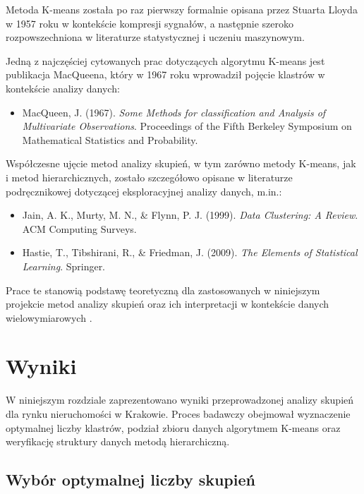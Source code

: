 \documentclass{report}
\begin{document}
Metoda K-means została po raz pierwszy formalnie opisana przez Stuarta Lloyda w 1957 roku w kontekście kompresji sygnałów, a następnie szeroko rozpowszechniona w literaturze statystycznej i uczeniu maszynowym.

Jedną z najczęściej cytowanych prac dotyczących algorytmu K-means jest publikacja MacQueena, który w 1967 roku wprowadził pojęcie klastrów w kontekście analizy danych:

\begin{itemize}
    \item MacQueen, J. (1967). \textit{Some Methods for classification and Analysis of Multivariate Observations}. Proceedings of the Fifth Berkeley Symposium on Mathematical Statistics and Probability.
\end{itemize}

Współczesne ujęcie metod analizy skupień, w tym zarówno metody K-means, jak i metod hierarchicznych, zostało szczegółowo opisane w literaturze podręcznikowej dotyczącej eksploracyjnej analizy danych, m.in.:

\begin{itemize}
    \item Jain, A. K., Murty, M. N., \& Flynn, P. J. (1999). \textit{Data Clustering: A Review}. ACM Computing Surveys.
    \item Hastie, T., Tibshirani, R., \& Friedman, J. (2009). \textit{The Elements of Statistical Learning}. Springer.
\end{itemize}

Prace te stanowią podstawę teoretyczną dla zastosowanych w niniejszym projekcie metod analizy skupień oraz ich interpretacji w kontekście danych wielowymiarowych \cite{macqueen1967,ward1963,jain1999,hastie2009}.







\chapter{Wyniki}

W niniejszym rozdziale zaprezentowano wyniki przeprowadzonej analizy skupień dla rynku nieruchomości w Krakowie. Proces badawczy obejmował wyznaczenie optymalnej liczby klastrów, podział zbioru danych algorytmem K-means oraz weryfikację struktury danych metodą hierarchiczną.

\section{Wybór optymalnej liczby skupień}
\end{document}
